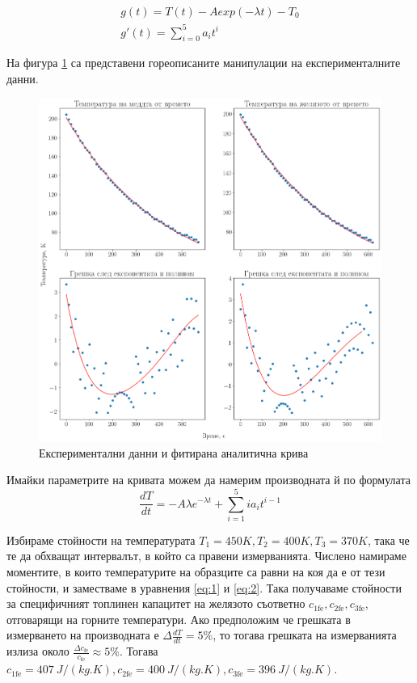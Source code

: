 \documentclass[
 reprint,
 amsmath,amssymb,
 aps,
]{revtex4-2}
\begin{document}
\begin{gather*}
    g(t) = T(t) - A exp(-\lambda t) - T_0 \\ 
    g'(t) = \sum_{i=0}^{5}{a_i t^i}
\end{gather*}

На фигура \ref{fig:1} са представени гореописаните манипулации на експерименталните данни. 

\begin{figure}
    \centering
    \includegraphics[width=\textwidth, keepaspectratio=true]{fig2.png} 
    \caption{Експериментални данни и фитирана аналитична крива}
    \label{fig:1}
\end{figure}

Имайки параметрите на кривата можем да намерим производната й по формулата 
\begin{equation*} \label{eq:2}
    \frac{dT}{dt} = -A\lambda e^{-\lambda t} + \sum_{i=1}^{5}{ia_i t^{i-1}} \tag{2}
\end{equation*}

Избираме стойности на температурата $T_1 = 450K, T_2 = 400K, T_3 = 370K$, така че те да обхващат интервалът, в който са правени измерванията. Числено намираме моментите, в които температурите на образците са равни на коя да е от тези стойности, и заместваме в уравнения \eqref{eq:1} и \eqref{eq:2}. Така получаваме стойности за специфичният топлинен капацитет на желязото съответно $c_{1\text{fe}}, c_{2\text{fe}}, c_{3\text{fe}}$, отговарящи на горните температури. Ако предположим че грешката в измерването на производната е $\Delta \frac{dT}{dt} = 5\%$, то тогава грешката на измерванията излиза около $\frac{\Delta c_{\text{fe}}}{c_{\text{fe}}} \approx 5\%$. Тогава $c_{1\text{fe}} = 407 \ \si{J/(kg.K)}, c_{2\text{fe}} = 400 \ \si{J/(kg.K)}, c_{3\text{fe}} = 396 \ \si{J/(kg.K)}$.
\end{document}
